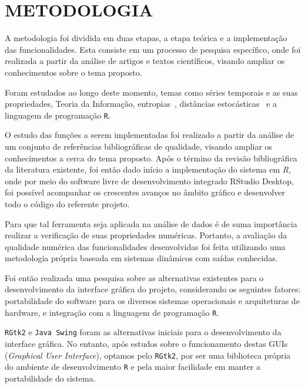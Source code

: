 \documentclass[12pt,letterpaper]{article}
\begin{document}
\newpage
\section*{\centering \textbf{METODOLOGIA}} %

A metodologia foi dividida em duas etapas, a etapa teórica e a implementação das funcionalidades.
Esta consiste em um processo de pesquisa específico, onde foi realizada a partir da análise de artigos e textos científicos, visando ampliar os conhecimentos sobre o tema proposto. 

Foram estudados ao longo deste momento, temas como séries temporais e as suas propriedades, Teoria da Informação, entropias~\cite{salicruetal1993}, distâncias estocásticas~\cite{StatisticalInferenceBasedonDivergenceMeasures} e a linguagem de programação \texttt R.

O estudo das funções a serem implementadas foi realizado a partir da análise de um conjunto de referências bibliográficas de qualidade, visando ampliar os conhecimentos a cerca do tema proposto. 
Após o término da revisão bibliográfica da literatura existente, foi então dado início a implementação do sistema em \textit{R}, onde por meio do software livre de desenvolvimento integrado RStudio Desktop, foi possível acompanhar os crescentes avanços no âmbito gráfico e desenvolver todo o código do referente projeto.

Para que tal ferramenta seja aplicada na análise de dados é de suma importância realizar a verificação de suas propriedades numéricas. 
Portanto, a avaliação da qualidade numérica das funcionalidades desenvolvidas foi feita utilizando uma metodologia própria baseada em sistemas dinâmicos com saídas conhecidas.

Foi então realizada uma pesquisa sobre as alternativas existentes para o desenvolvimento da interface gráfica do projeto, considerando os seguintes fatores: portabilidade do software para os diversos sistemas operacionais e arquiteturas de hardware, e integração com a linguagem de programação \texttt R.

\texttt{RGtk2} e \texttt{Java Swing} foram as alternativas iniciais para o desenvolvimento da interface gráfica. 
No entanto, após estudos sobre o funcionamento destas GUIs (\textit{Graphical User Interface}), optamos pelo \texttt{RGtk2}, por ser uma biblioteca própria do ambiente de desenvolvimento \texttt R e pela maior facilidade em manter a portabilidade do sistema.
\end{document}
